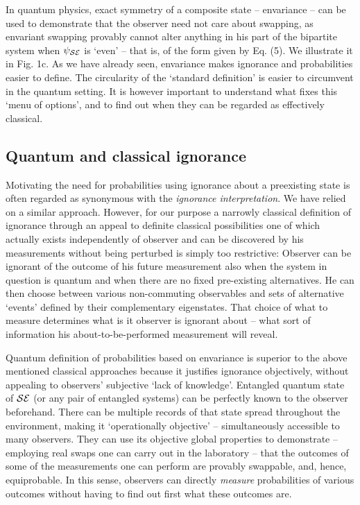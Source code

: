 \documentclass[aps,twocolumn,pra,epsfig]{revtex4}
\begin{document}
In quantum physics, exact symmetry of a composite state -- envariance --
can be used to demonstrate that the observer need not care about swapping,
as envariant swapping provably cannot alter anything in his part of the
bipartite system when $\psi_{\cal SE}$ is `even' -- that is, of the form
given by Eq. (5). We illustrate it in Fig. 1c. As we have already seen, 
envariance makes ignorance and probabilities easier to define.  
The circularity of the `standard definition' is easier to circumvent
in the quantum setting. It is however important to understand what fixes
this `menu of options', and to find out when they can be regarded as
effectively classical. 

\subsection{Quantum and classical ignorance}

Motivating the need for probabilities using ignorance about a preexisting state
is often regarded as synonymous with the {\it ignorance interpretation}.  
We have relied on a similar approach. However, for our purpose
a narrowly classical definition of ignorance through an appeal to definite
classical possibilities one of which actually exists independently of observer
and can be discovered by his measurements without being perturbed is simply
too restrictive: Observer can be ignorant of the outcome of his future
measurement also when the system in question is quantum and when there
are no fixed pre-existing alternatives. He can then choose between various
non-commuting observables and sets of alternative `events' defined by
their complementary eigenstates. That choice of what to measure
determines what is it observer is ignorant about -- what sort of information 
his about-to-be-performed measurement will reveal.

Quantum definition of probabilities based on envariance is superior to the
above mentioned classical approaches because it justifies ignorance 
objectively, without appealing to observers' subjective `lack of knowledge'. 
Entangled quantum state of ${\cal SE}$ (or any pair of entangled systems)
can be perfectly known to the observer beforehand. There can be multiple 
records of that state spread throughout the environment, making it 
`operationally objective' -- simultaneously accessible to many observers. 
They can use its objective global properties to demonstrate -- employing real 
swaps one can carry out in the laboratory -- that the outcomes of some of 
the measurements one can perform are provably swappable, and, hence, 
equiprobable. In this sense, observers can directly {\it measure} probabilities 
of various outcomes without having to find out first what these outcomes are.
\end{document}
